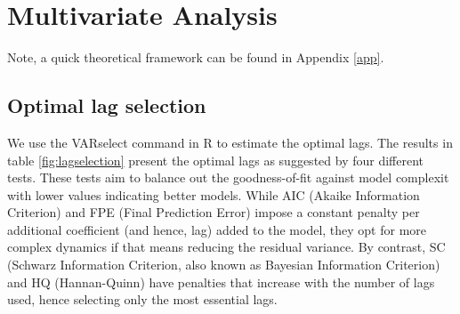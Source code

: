 \documentclass[
]{article}
\begin{document}
	\section{Multivariate Analysis}
	
	Note, a quick theoretical framework can be found in Appendix \ref{app}.
	
	\subsection{Optimal lag selection}
	
	We use the VARselect command in R to estimate the optimal lags. The results in 
	table \ref{fig:lagselection} present the optimal lags as suggested by four different tests. These
	tests aim to balance out the goodness-of-fit against model complexit with lower 
	values indicating better models. While AIC 
	(Akaike Information Criterion) and FPE (Final Prediction Error) impose a constant
	penalty per additional coefficient (and hence, lag) added to the model, they opt
	for more complex dynamics if that means reducing the residual variance. 
	By contrast, SC (Schwarz Information Criterion, also known as Bayesian Information Criterion) 
	and HQ (Hannan-Quinn) have penalties that increase with the number of lags used, 
	hence selecting only the most essential lags. 
	
\end{document}
